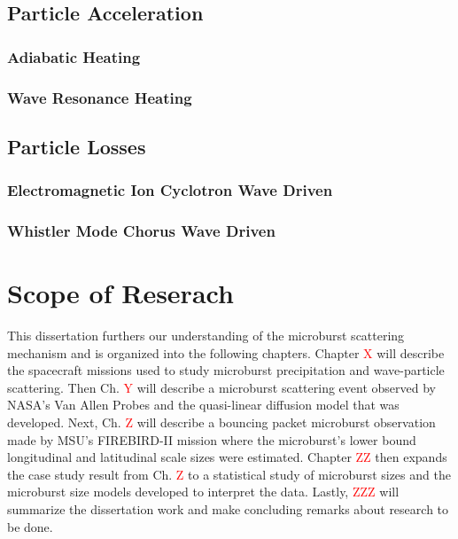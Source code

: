 \subsection{Particle Acceleration}\label{Intro:acceleration}

\subsubsection{Adiabatic Heating}\label{Intro:adiabatic_heating}

\subsubsection{Wave Resonance Heating}\label{Intro:wave_heating}

\subsection{Particle Losses}\label{Intro:acceleration}

\subsubsection{Electromagnetic Ion Cyclotron Wave Driven}\label{Intro:emic_scattering}

\subsubsection{Whistler Mode Chorus Wave Driven}\label{Intro:chorus_scattering}

\section{Scope of Reserach}\label{Intro:scope}
This dissertation furthers our understanding of the microburst scattering mechanism and is organized into the following chapters. Chapter \textcolor{red}{X} will describe the spacecraft missions used to study microburst precipitation and wave-particle scattering. Then Ch. \textcolor{red}{Y} will describe a microburst scattering event observed by NASA's Van Allen Probes and the quasi-linear diffusion model that was developed. Next, Ch. \textcolor{red}{Z} will describe a bouncing packet microburst observation made by MSU's FIREBIRD-II mission where the microburst's lower bound longitudinal and latitudinal scale sizes were estimated. Chapter \textcolor{red}{ZZ} then expands the case study result from Ch. \textcolor{red}{Z} to a statistical study of microburst sizes and the microburst size models developed to interpret the data. Lastly, \textcolor{red}{ZZZ} will summarize the dissertation work and make concluding remarks about research to be done.